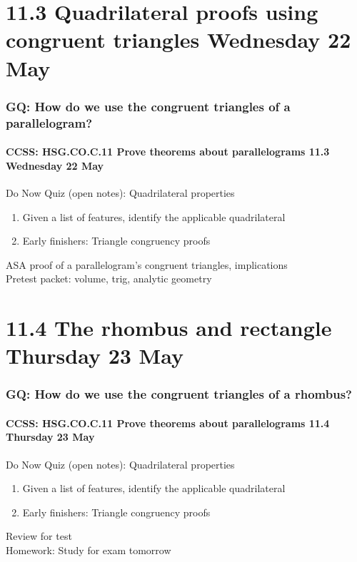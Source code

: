 \documentclass{beamer}
\begin{document}
\section{11.3 Quadrilateral proofs using congruent triangles Wednesday 22 May}
  \frame
  {
    \frametitle{GQ: How do we use the congruent triangles of a parallelogram?}
    \framesubtitle{CCSS: HSG.CO.C.11 Prove theorems about parallelograms \hfill \alert{11.3 Wednesday 22 May}}

    \begin{block}{Do Now Quiz (open notes): Quadrilateral properties}
      \begin{enumerate}
        \item Given a list of features, identify the applicable quadrilateral
        \item Early finishers: Triangle congruency proofs
      \end{enumerate}
    \end{block}
    ASA proof of a parallelogram's congruent triangles, implications\\
    Pretest packet: volume, trig, analytic geometry
  }

\section{11.4 The rhombus and rectangle Thursday 23 May}
  \frame
  {
    \frametitle{GQ: How do we use the congruent triangles of a rhombus?}
    \framesubtitle{CCSS: HSG.CO.C.11 Prove theorems about parallelograms \hfill \alert{11.4 Thursday 23 May}}

    \begin{block}{Do Now Quiz (open notes): Quadrilateral properties}
      \begin{enumerate}
        \item Given a list of features, identify the applicable quadrilateral
        \item Early finishers: Triangle congruency proofs
      \end{enumerate}
    \end{block}
    Review for test\\[0.5cm]
    Homework: Study for \alert{exam tomorrow}
  }
\end{document}
